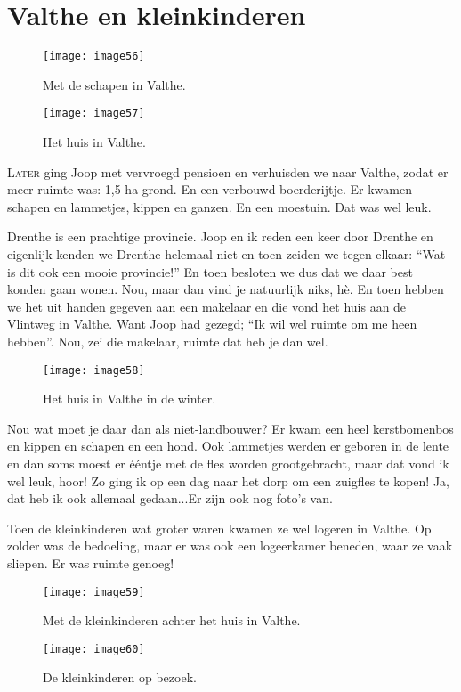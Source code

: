 
\chapter*{\label{ref-012}Valthe en kleinkinderen}

\begin{figure}[h]
    \texttt{[image: image56]}
    \caption{Met de schapen in Valthe.}
\end{figure}

\begin{figure}[h]
    \texttt{[image: image57]}
    \caption{Het huis in Valthe.}
\end{figure}

\lettrine[lines=2, loversize=0.3, lraise=0]{\initfamily L}{ater} ging Joop met vervroegd pensioen en verhuisden we naar Valthe, zodat er meer ruimte was: 1,5 ha grond. En een verbouwd boerderijtje. Er kwamen schapen en lammetjes, kippen en ganzen. En een moestuin. Dat was wel leuk.

Drenthe is een prachtige provincie. Joop en ik reden een keer door Drenthe en eigenlijk kenden we Drenthe helemaal niet en toen zeiden we tegen elkaar: ``Wat is dit ook een mooie provincie!'' En toen besloten we dus dat we daar best konden gaan wonen. Nou, maar dan vind je natuurlijk niks, h\`{e}. En toen hebben we het uit handen gegeven aan een makelaar en die vond het huis aan de Vlintweg in Valthe. Want Joop had gezegd; ``Ik wil wel ruimte om me heen hebben''. Nou, zei die makelaar, ruimte dat heb je dan wel. 

\begin{figure}[h]
    \texttt{[image: image58]}
    \caption{Het huis in Valthe in de winter.}
\end{figure}

Nou wat moet je daar dan als niet-landbouwer? Er kwam een heel kerstbomenbos en kippen en schapen en een hond. Ook lammetjes werden er geboren in de lente en dan soms moest er \'{e}\'{e}ntje met de fles worden grootgebracht, maar dat vond ik wel leuk, hoor! Zo ging ik op een dag naar het dorp om een zuigfles te kopen! Ja, dat heb ik ook allemaal gedaan...Er zijn ook nog foto’s van. 

Toen de kleinkinderen wat groter waren kwamen ze wel logeren in Valthe. Op zolder was de bedoeling, maar er was ook een logeerkamer beneden, waar ze vaak sliepen. Er was ruimte genoeg!

\begin{figure}[h]
    \texttt{[image: image59]}
    \caption{Met de kleinkinderen achter het huis in Valthe.}
\end{figure}
\begin{figure}[h]
    \texttt{[image: image60]}
    \caption{De kleinkinderen op bezoek.}
\end{figure}

